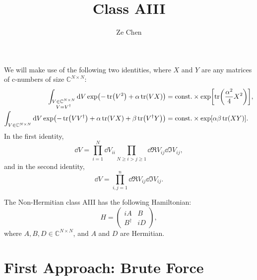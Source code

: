 \documentclass{article}
\title{Class AIII}
\author{Ze Chen}
\begin{document}
\maketitle

We will make use of the following two identities, where $X$ and $Y$ are any matrices of c-numbers of size $\mathbb{C}^{N\times N}$:
\begin{align*}
    \int_{\substack{V\in \mathbb{C}^{N\times N} \\ V=V^\dagger}} \dd{V} \exp(-\tr(V^2) + \alpha\tr(VX)) &= \mathrm{const.} \times \exp[\tr(\frac{\alpha^2}{4}X^2)], \\
    \int_{V\in \mathbb{C}^{N\times N}} \dd{V} \exp(-\tr(VV^\dagger) + \alpha\tr(VX) + \beta \tr(V^\dagger Y)) &= \mathrm{const.} \times \exp[\alpha\beta \tr(XY)].
\end{align*}
In the first identity,
\[ \dd{V} = \prod_{i=1}^N \dd{V_{ii}} \prod_{N \ge i>j\ge 1} \dd{\Re V_{ij}} \dd{\Im V_{ij}}, \]
and in the second identity,
\[ \dd{V} = \prod_{i,j=1}^n \dd{\Re V_{ij}} \dd{\Im V_{ij}}. \]

\par
The Non-Hermitian class AIII has the following Hamiltonian:
\[ H = \begin{pmatrix}
    iA & B \\
    B^\dagger & iD
\end{pmatrix}, \]
where $A,B,D \in \mathbb{C}^{N\times N}$, and $A$ and $D$ are Hermitian.

\section{First Approach: Brute Force}
\end{document}
